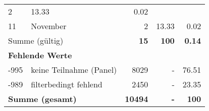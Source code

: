 \begin{longtable}{lXrrr}
       \num{2} &
       \num[round-mode=places,round-precision=2]{13,33} &
         \num[round-mode=places,round-precision=2]{0,02} \\

     11 &
     \multicolumn{1}{X}{ November   } &


       \num{2} &
       \num[round-mode=places,round-precision=2]{13,33} &
         \num[round-mode=places,round-precision=2]{0,02} \\
     \midrule
     \multicolumn{2}{l}{Summe (gültig)} &
       \textbf{\num{15}} &
     \textbf{100} &
       \textbf{\num[round-mode=places,round-precision=2]{0,14}} \\
     \multicolumn{5}{l}{\textbf{Fehlende Werte}}\\
       -995 &
       keine Teilnahme (Panel) &
         \num{8029} &
        - &
         \num[round-mode=places,round-precision=2]{76,51} \\
       -989 &
       filterbedingt fehlend &
         \num{2450} &
        - &
         \num[round-mode=places,round-precision=2]{23,35} \\
     \midrule
     \multicolumn{2}{l}{\textbf{Summe (gesamt)}} &
          \textbf{\num{10494}} &
        \textbf{-} &
        \textbf{100} \\
     \bottomrule
     \end{longtable}
     
